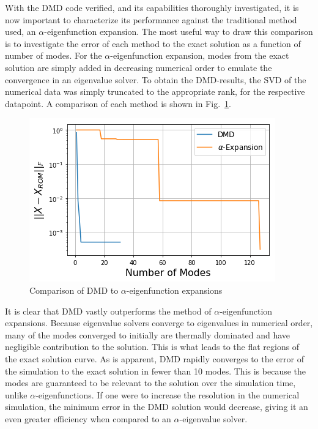 \documentclass[12pt]{article}
\newcommand{\LFI}[1]{\label{fi:#1}}
\newcommand{\FI}[1]{Fig.~\ref{fi:#1}}
\newcommand{\bfg}{\begin{figure}}
\newcommand{\efg}{\end{figure}}
\begin{document}
With the DMD code verified, and its capabilities thoroughly investigated, it is 
	now important to characterize its performance against the traditional 
	method used, an $\alpha$-eigenfunction expansion.
The most useful way to draw this comparison is to investigate the error of each 
	method to the exact solution as a function of number of modes.
For the $\alpha$-eigenfunction expansion, modes from the exact solution are 
	simply added in decreasing numerical order to emulate the convergence in an 
	eigenvalue solver.
To obtain the DMD-results, the SVD of the numerical data was simply truncated 
	to the appropriate rank, for the respective datapoint.
A comparison of each method is shown in \FI{comp}. 
%
\bfg[!htb] \centering
	\includegraphics[scale=0.5]{method_comparison.png}
	\caption{Comparison of DMD to $\alpha$-eigenfunction expansions}
	\LFI{comp}
\efg

It is clear that DMD vastly outperforms the method of $\alpha$-eigenfunction 
	expansions.
Because eigenvalue solvers converge to eigenvalues in numerical order, many of 
	the modes converged to initially are thermally dominated and have negligible 
	contribution to the solution. 
This is what leads to the flat regions of the exact solution curve.
As is apparent, DMD rapidly converges to the error of the simulation to the 
	exact solution in fewer than 10 modes.
This is because the modes are guaranteed to be relevant to the solution over the
	simulation time, unlike $\alpha$-eigenfunctions.
If one were to increase the resolution in the numerical simulation, the minimum
	error in the DMD solution would decrease, giving it an even greater efficiency
	when compared to an $\alpha$-eigenvalue solver.
\end{document}
